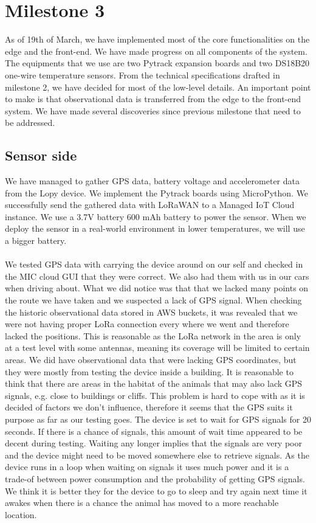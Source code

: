 \section{Milestone 3}
	As of 19th of March, we have implemented most of the core functionalities on the edge and the front-end. We have made progress on all components of the system. The equipments that we use are two Pytrack expansion boards and two DS18B20 one-wire temperature sensors. From the technical specifications drafted in milestone 2, we have decided for most of the low-level details. An important point to make is that observational data is transferred from the edge to the front-end system. We have made several discoveries since previous milestone that need to be addressed.
 

	\subsection{Sensor side}
		We have managed to gather GPS data, battery voltage and accelerometer data from the Lopy device. We implement the Pytrack boards using MicroPython. We successfully send the gathered data with LoRaWAN to a Managed IoT Cloud instance. We use a 3.7V battery 600 mAh battery to power the sensor. When we deploy the sensor in a real-world environment in lower temperatures, we will use a bigger battery. \\\\
		We tested GPS data with carrying the device around on our self and checked in the MIC cloud GUI that they were correct. We also had them with us in our cars when driving about. What we did notice was that that we lacked many points on the route we have taken and we suspected a lack of GPS signal. When checking the historic observational data stored in AWS buckets, it was revealed that we were not having proper LoRa connection every where we went and therefore lacked the positions. This is reasonable as the LoRa network in the area is only at a test level with some antennas, meaning its coverage will be limited to certain areas. We did have observational data that were lacking GPS coordinates, but they were mostly from testing the device inside a building. It is reasonable to think that there are areas in the habitat of the animals that may also lack GPS signals, e.g. close to buildings or cliffs. This problem is hard to cope with as it is decided of factors we don't influence, therefore it seems that the GPS suits it purpose as far as our testing goes. The device is set to wait for GPS signals for 20 seconds. If there is a chance of signals, this amount of wait time appeared to be decent during testing. Waiting any longer implies that the signals are very poor and the device might need to be moved somewhere else to retrieve signals. As the device runs in a loop when waiting on signals it uses much power and it is a trade-of between power consumption and the probability of getting GPS signals. We think it is better they for the device to go to sleep and try again next time it awakes when there is a chance the animal has moved to a more reachable location. \\\\  
